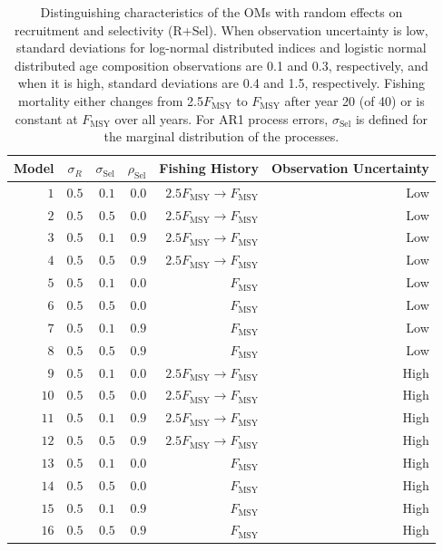 \documentclass[
  12pt,
]{article}
\begin{document}
\begin{table}
\caption{Distinguishing characteristics of the OMs with random effects on recruitment and selectivity (R+Sel). When observation uncertainty is low, standard deviations for log-normal distributed indices and logistic normal distributed age composition observations are 0.1 and 0.3, respectively, and when it is high, standard deviations are 0.4 and 1.5, respectively. Fishing mortality either changes from 2.5$F_{\text{MSY}}$ to $F_{\text{MSY}}$ after year 20 (of 40) or is constant at $F_{\text{MSY}}$ over all years. For AR1 process errors, $\sigma_{\text{Sel}}$ is defined for the marginal distribution of the processes.}\label{sel_om_table}
{\begin{center}
\begin{tabular}{rrrrrr}
\hline\hline
\multicolumn{1}{c}{Model}&\multicolumn{1}{c}{$\sigma_R$}&\multicolumn{1}{c}{$\sigma_{\text{Sel}}$}&\multicolumn{1}{c}{$\rho_{\text{Sel}}$}&\multicolumn{1}{c}{Fishing History}&\multicolumn{1}{c}{Observation Uncertainty}\tabularnewline
\hline
$ 1$&$0.5$&$0.1$&$0.0$&$2.5 F_{\text{MSY}} \rightarrow F_{\text{MSY}}$&Low\tabularnewline
$ 2$&$0.5$&$0.5$&$0.0$&$2.5 F_{\text{MSY}} \rightarrow F_{\text{MSY}}$&Low\tabularnewline
$ 3$&$0.5$&$0.1$&$0.9$&$2.5 F_{\text{MSY}} \rightarrow F_{\text{MSY}}$&Low\tabularnewline
$ 4$&$0.5$&$0.5$&$0.9$&$2.5 F_{\text{MSY}} \rightarrow F_{\text{MSY}}$&Low\tabularnewline
$ 5$&$0.5$&$0.1$&$0.0$&$F_{\text{MSY}}$&Low\tabularnewline
$ 6$&$0.5$&$0.5$&$0.0$&$F_{\text{MSY}}$&Low\tabularnewline
$ 7$&$0.5$&$0.1$&$0.9$&$F_{\text{MSY}}$&Low\tabularnewline
$ 8$&$0.5$&$0.5$&$0.9$&$F_{\text{MSY}}$&Low\tabularnewline
$ 9$&$0.5$&$0.1$&$0.0$&$2.5 F_{\text{MSY}} \rightarrow F_{\text{MSY}}$&High\tabularnewline
$10$&$0.5$&$0.5$&$0.0$&$2.5 F_{\text{MSY}} \rightarrow F_{\text{MSY}}$&High\tabularnewline
$11$&$0.5$&$0.1$&$0.9$&$2.5 F_{\text{MSY}} \rightarrow F_{\text{MSY}}$&High\tabularnewline
$12$&$0.5$&$0.5$&$0.9$&$2.5 F_{\text{MSY}} \rightarrow F_{\text{MSY}}$&High\tabularnewline
$13$&$0.5$&$0.1$&$0.0$&$F_{\text{MSY}}$&High\tabularnewline
$14$&$0.5$&$0.5$&$0.0$&$F_{\text{MSY}}$&High\tabularnewline
$15$&$0.5$&$0.1$&$0.9$&$F_{\text{MSY}}$&High\tabularnewline
$16$&$0.5$&$0.5$&$0.9$&$F_{\text{MSY}}$&High\tabularnewline
\hline
\end{tabular}\end{center}
}
\end{table}
\end{document}
